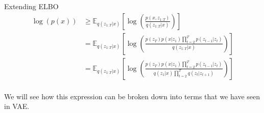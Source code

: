 \begin{frame}{Extending ELBO}
    \begin{align*}
        \log(p(x)) &\geq \mathbb{E}_{q(z_{1:T}|x)} \left[ \log \left( \frac{p(x, z_{1:T})}{q(z_{1:T}|x)} \right) \right] \\
        &= \mathbb{E}_{q(z_{1:T}|x)} \left[ \log \left( \frac{p(z_T)p(x|z_1) \prod_{t=2}^{T} p(z_{t-1}|z_t)}{q(z_{1:T}|x)} \right) \right] \\
        &= \mathbb{E}_{q(z_{1:T}|x)} \left[ \log \left( \frac{p(z_T)p(x|z_1) \prod_{t=2}^{T} p(z_{t-1}|z_t)}{q(z_1|x) \prod_{t=2}^{T} q(z_t|z_{t+1})} \right) \right] \\
    \end{align*}

    We will see how this expression can be broken down into terms that we have seen in VAE.
\end{frame}